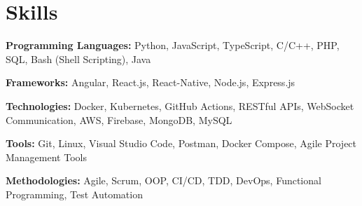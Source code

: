 \section{Skills}
\vspace{2pt}
\resumeSubHeadingListStart
\small{\item{

              \textbf{Programming Languages:}{ Python, JavaScript, TypeScript, C/C++, PHP, SQL, Bash (Shell Scripting), Java} \\ \vspace{3pt}

              \textbf{Frameworks:}{ Angular, React.js, React-Native, Node.js, Express.js} \\ \vspace{3pt}

              \textbf{Technologies:}{ Docker, Kubernetes, GitHub Actions, RESTful APIs, WebSocket Communication, AWS, Firebase, MongoDB, MySQL} \\ \vspace{3pt}

              \textbf{Tools:}{ Git, Linux, Visual Studio Code, Postman, Docker Compose, Agile Project Management Tools} \\ \vspace{3pt}

              \textbf{Methodologies:}{ Agile, Scrum, OOP, CI/CD, TDD, DevOps, Functional Programming, Test Automation} \\ \vspace{3pt}

        }}
\resumeSubHeadingListEnd
